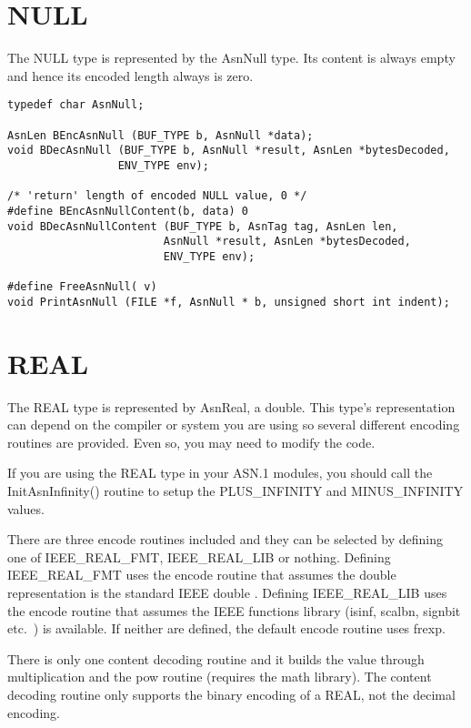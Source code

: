 \section{\label{null-C-section}NULL}

The NULL type is represented by the {\C AsnNull} type.  Its content
is always empty and hence its encoded length always is zero.
\begin{small}
\begin{verbatim}
typedef char AsnNull;

AsnLen BEncAsnNull (BUF_TYPE b, AsnNull *data);
void BDecAsnNull (BUF_TYPE b, AsnNull *result, AsnLen *bytesDecoded,
                 ENV_TYPE env);

/* 'return' length of encoded NULL value, 0 */
#define BEncAsnNullContent(b, data) 0
void BDecAsnNullContent (BUF_TYPE b, AsnTag tag, AsnLen len,
                        AsnNull *result, AsnLen *bytesDecoded,
                        ENV_TYPE env);

#define FreeAsnNull( v)
void PrintAsnNull (FILE *f, AsnNull * b, unsigned short int indent);
\end{verbatim}
\end{small}

\section{\label{real-C-section}REAL}

The REAL type is represented by {\C AsnReal}, a double.  This type's
representation can depend on the compiler or system you are using so
several different encoding routines are provided.
Even so, you may need to modify the code.

If you are using the REAL type in your ASN.1 modules, you should call the
{\C InitAsnInfinity()} routine to setup the {\C PLUS\_INFINITY}
and {\C MINUS\_INFINITY} values.

There are three encode routines included and they can be selected by
defining one of {\C IEEE\_REAL\_FMT}, {\C IEEE\_REAL\_LIB} or nothing.
Defining {\C IEEE\_REAL\_FMT} uses the encode routine that assumes the
double representation is the standard IEEE double \cite{68881}.
Defining {\C IEEE\_REAL\_LIB} uses the encode routine that assumes the
IEEE functions library (isinf, scalbn, signbit etc.\ ) is available.
If neither are defined, the default encode routine uses {\C frexp}.

There is only one content decoding routine and it builds the value
through multiplication and the {\C pow} routine (requires the math
library).  The content decoding routine only supports the binary
encoding of a REAL, not the decimal encoding.

